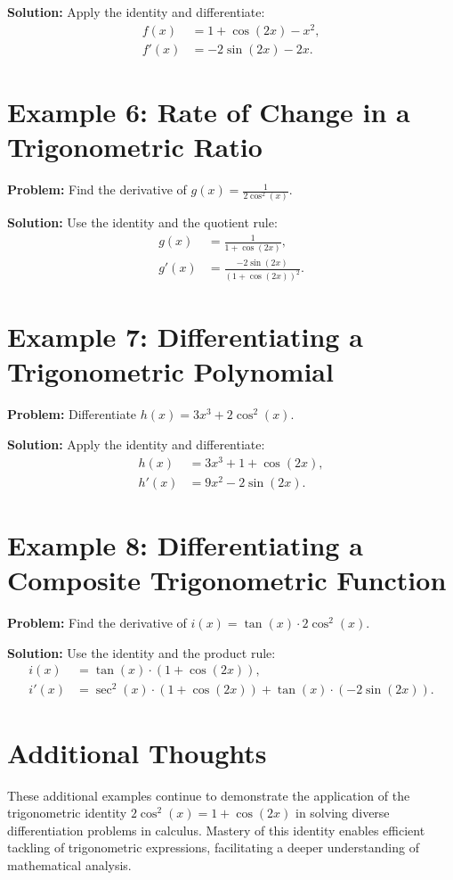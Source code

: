 \documentclass[a4paper,12pt]{book}
\newcounter{problem}
\newcounter{example}
\begin{document}
\textbf{Solution:}
Apply the identity and differentiate:
\begin{align*}
f(x) &= 1 + \cos(2x) - x^2, \\
f'(x) &= -2 \sin(2x) - 2x.
\end{align*}

\section*{Example 6: Rate of Change in a Trigonometric Ratio}
\textbf{Problem:} Find the derivative of \(g(x) = \frac{1}{2 \cos^2(x)}\).

\textbf{Solution:}
Use the identity and the quotient rule:
\begin{align*}
g(x) &= \frac{1}{1 + \cos(2x)}, \\
g'(x) &= \frac{-2 \sin(2x)}{(1 + \cos(2x))^2}.
\end{align*}

\section*{Example 7: Differentiating a Trigonometric Polynomial}
\textbf{Problem:} Differentiate \(h(x) = 3x^3 + 2 \cos^2(x)\).

\textbf{Solution:}
Apply the identity and differentiate:
\begin{align*}
h(x) &= 3x^3 + 1 + \cos(2x), \\
h'(x) &= 9x^2 - 2 \sin(2x).
\end{align*}

\section*{Example 8: Differentiating a Composite Trigonometric Function}
\textbf{Problem:} Find the derivative of \(i(x) = \tan(x) \cdot 2 \cos^2(x)\).

\textbf{Solution:}
Use the identity and the product rule:
\begin{align*}
i(x) &= \tan(x) \cdot (1 + \cos(2x)), \\
i'(x) &= \sec^2(x) \cdot (1 + \cos(2x)) + \tan(x) \cdot (-2 \sin(2x)).
\end{align*}

\section*{Additional Thoughts}
These additional examples continue to demonstrate the application of the trigonometric identity \(2 \cos^2(x) = 1 + \cos(2x)\) in solving diverse differentiation problems in calculus. Mastery of this identity enables efficient tackling of trigonometric expressions, facilitating a deeper understanding of mathematical analysis.
\end{document}
